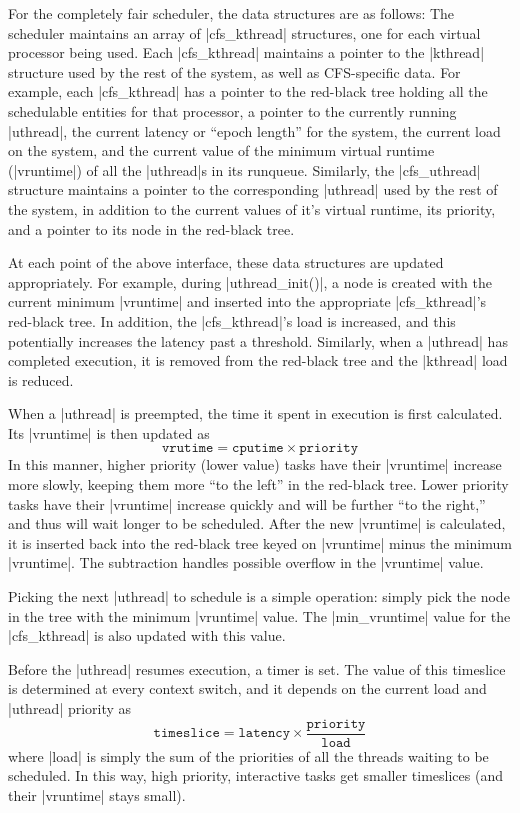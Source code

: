 \documentclass[]{article}
\begin{document}
For the completely fair scheduler, the data structures are as follows:
The scheduler maintains an array of |cfs_kthread| structures, one for
each virtual processor being used. Each |cfs_kthread| maintains a
pointer to the |kthread| structure used by the rest of the system, as
well as CFS-specific data. For example, each |cfs_kthread| has a
pointer to the red-black tree holding all the schedulable entities for
that processor, a pointer to the currently running |uthread|, the
current latency or ``epoch length'' for the system, the current load
on the system, and the current value of the minimum virtual runtime
(|vruntime|) of all the |uthread|s in its runqueue. Similarly, the
|cfs_uthread| structure maintains a pointer to the corresponding
|uthread| used by the rest of the system, in addition to the current
values of it's virtual runtime, its priority, and a pointer to its
node in the red-black tree.

At each point of the above interface, these data structures are
updated appropriately. For example, during |uthread_init()|, a node is
created with the current minimum |vruntime| and inserted into the
appropriate |cfs_kthread|'s red-black tree. In addition, the
|cfs_kthread|'s load is increased, and this potentially increases the
latency past a threshold. Similarly, when a |uthread| has completed
execution, it is removed from the red-black tree and the |kthread|
load is reduced.

When a |uthread| is preempted, the time it spent in execution is first
calculated. Its |vruntime| is then updated as
\begin{equation}
  \mathtt{vrutime} = \mathtt{cputime} \times \mathtt{priority}
\end{equation}
In this manner, higher priority (lower value) tasks have their
|vruntime| increase more slowly, keeping them more ``to the left'' in
the red-black tree. Lower priority tasks have their |vruntime|
increase quickly and will be further ``to the right,'' and thus will
wait longer to be scheduled. After the new |vruntime| is calculated,
it is inserted back into the red-black tree keyed on |vruntime| minus
the minimum |vruntime|. The subtraction handles possible overflow in
the |vruntime| value.

Picking the next |uthread| to schedule is a simple operation: simply
pick the node in the tree with the minimum |vruntime| value. The
|min_vruntime| value for the |cfs_kthread| is also updated with this
value.

Before the |uthread| resumes execution, a timer is set. The value of
this timeslice is determined at every context switch, and it depends
on the current load and |uthread| priority as
\begin{equation}
  \mathtt{timeslice} = \mathtt{latency} \times
  \frac{\mathtt{priority}}{\mathtt{load}}
\end{equation}
where |load| is simply the sum of the priorities of all the threads
waiting to be scheduled. In this way, high priority, interactive tasks
get smaller timeslices (and their |vruntime| stays small).
\end{document}

